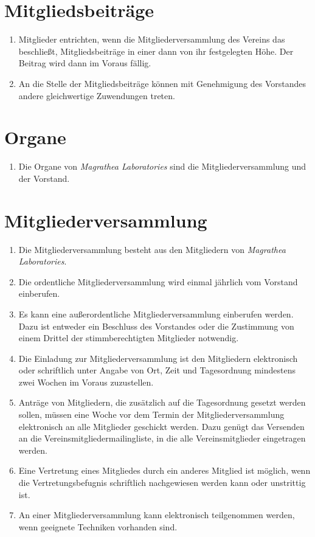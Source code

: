 \documentclass[ngerman]{article}
\begin{document}
\section{Mitgliedsbeiträge}
\begin{enumerate}
\item Mitglieder entrichten, wenn die Mitgliederversammlung des Vereins das beschließt, Mitgliedsbeiträge in einer dann von ihr festgelegten Höhe. Der Beitrag wird dann im Voraus fällig.
\item An die Stelle der Mitgliedsbeiträge können mit Genehmigung des Vorstandes andere gleichwertige Zuwendungen treten.
\end{enumerate}

\section{Organe}
\begin{enumerate}
\item Die Organe von \emph{Magrathea Laboratories} sind die Mitgliederversammlung und der Vorstand.
\end{enumerate}

\section{Mitgliederversammlung}
\begin{enumerate}
\item Die Mitgliederversammlung besteht aus den Mitgliedern von \emph{Magrathea Laboratories}.
\item Die ordentliche Mitgliederversammlung wird einmal jährlich vom Vorstand einberufen.
\item Es kann eine außerordentliche Mitgliederversammlung einberufen werden. Dazu ist entweder ein Beschluss des Vorstandes oder die Zustimmung
von einem Drittel der stimmberechtigten Mitglieder notwendig.
\item Die Einladung zur Mitgliederversammlung ist den Mitgliedern elektronisch oder schriftlich unter Angabe von Ort, Zeit und Tagesordnung mindestens zwei Wochen im Voraus zuzustellen.
\item Anträge von Mitgliedern, die zusätzlich auf die Tagesordnung gesetzt werden sollen, müssen eine Woche vor dem Termin der Mitgliederversammlung elektronisch an alle Mitglieder geschickt werden. Dazu genügt das Versenden an die Vereinsmitgliedermailingliste, in die alle Vereinsmitglieder eingetragen werden.
\item Eine Vertretung eines Mitgliedes durch ein anderes Mitglied ist möglich, wenn die Vertretungsbefugnis schriftlich nachgewiesen werden kann oder unstrittig ist.
\item An einer Mitgliederversammlung kann elektronisch teilgenommen werden, wenn geeignete Techniken vorhanden sind.
\end{enumerate}
\end{document}

